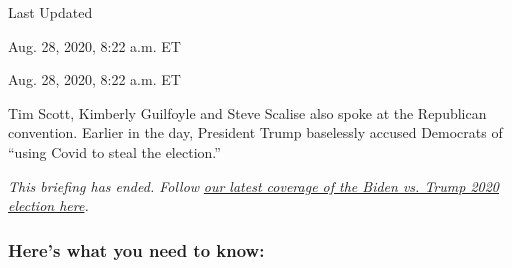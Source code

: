 Last Updated

Aug. 28, 2020, 8:22 a.m. ET

Aug. 28, 2020, 8:22 a.m. ET

Tim Scott, Kimberly Guilfoyle and Steve Scalise also spoke at the
Republican convention. Earlier in the day, President Trump baselessly
accused Democrats of ``using Covid to steal the election.''

\emph{This briefing has ended. Follow}
\href{https://www.nytimes3xbfgragh.onion/live/2020/08/25/us/rnc-convention-election}{\emph{our
latest coverage of the Biden vs. Trump 2020 election here}}\emph{.}

\hypertarget{heres-what-you-need-to-know}{%
\subsubsection{Here's what you need to
know:}\label{heres-what-you-need-to-know}}

